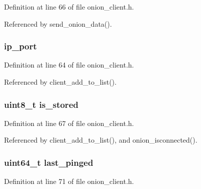 Definition at line 66 of file onion\+\_\+client.\+h.



Referenced by send\+\_\+onion\+\_\+data().

\hypertarget{struct_onion___node_a86e2a5a56c0dd22df6e8b8a10e40f9e4}{
\subsubsection[{ip\+\_\+port}]{ ip\+\_\+port}}\label{struct_onion___node_a86e2a5a56c0dd22df6e8b8a10e40f9e4}


Definition at line 64 of file onion\+\_\+client.\+h.



Referenced by client\+\_\+add\+\_\+to\+\_\+list().

\hypertarget{struct_onion___node_ada3701a9ce02699f1b7e8f55a41379bf}{
\subsubsection[{is\+\_\+stored}]{\setlength{\rightskip}{0pt plus 5cm}uint8\+\_\+t is\+\_\+stored}}\label{struct_onion___node_ada3701a9ce02699f1b7e8f55a41379bf}


Definition at line 67 of file onion\+\_\+client.\+h.



Referenced by client\+\_\+add\+\_\+to\+\_\+list(), and onion\+\_\+isconnected().

\hypertarget{struct_onion___node_a4049204f6c392628d31be6c39f03e031}{
\subsubsection[{last\+\_\+pinged}]{\setlength{\rightskip}{0pt plus 5cm}uint64\+\_\+t last\+\_\+pinged}}\label{struct_onion___node_a4049204f6c392628d31be6c39f03e031}


Definition at line 71 of file onion\+\_\+client.\+h.



